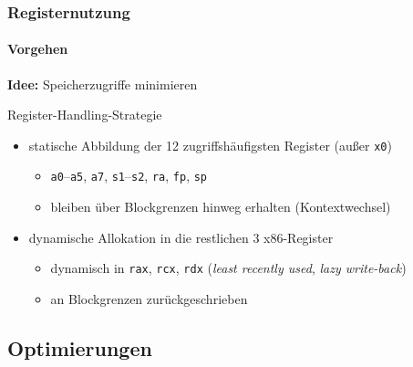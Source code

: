 \begin{frame}
	\frametitle{Registernutzung}
	\framesubtitle{Vorgehen}
	
	\textbf{Idee:} Speicherzugriffe minimieren
	
	\vspace{0.50cm}
	
	\pause
	\begin{block}{Register-Handling-Strategie}
		\begin{itemize}
			\item statische Abbildung der 12 zugriffshäufigsten Register (außer \texttt{x0})
			\begin{itemize}
				\item \texttt{a0}--\texttt{a5}, \texttt{a7}, \texttt{s1}--\texttt{s2}, \texttt{ra}, \texttt{fp}, \texttt{sp}
				\item bleiben über Blockgrenzen hinweg erhalten ( Kontextwechsel)
			\end{itemize}
			
			\pause
			\item dynamische Allokation in die restlichen 3 x86-Register
			\begin{itemize}
				\item dynamisch in \texttt{rax}, \texttt{rcx}, \texttt{rdx} (\textit{least recently used}, \textit{lazy write-back})
				\item an Blockgrenzen zurückgeschrieben
			\end{itemize}
		\end{itemize}
	\end{block}
	
\end{frame}


\subsection{Optimierungen} %

